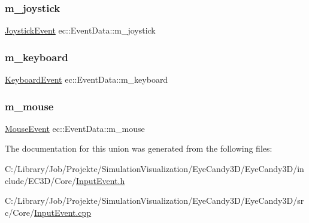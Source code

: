 \subsubsection{\texorpdfstring{m\+\_\+joystick}{m\_joystick}}
{\footnotesize\ttfamily \mbox{\hyperlink{structec_1_1_joystick_event}{Joystick\+Event}} ec\+::\+Event\+Data\+::m\+\_\+joystick}

\mbox{\label{unionec_1_1_event_data_a76d355d62f63e9947187e08bc520af45}} 
\subsubsection{\texorpdfstring{m\+\_\+keyboard}{m\_keyboard}}
{\footnotesize\ttfamily \mbox{\hyperlink{structec_1_1_keyboard_event}{Keyboard\+Event}} ec\+::\+Event\+Data\+::m\+\_\+keyboard}

\mbox{\label{unionec_1_1_event_data_a77d2274d869ab46f8f5f1e5d9616d4d3}} 
\subsubsection{\texorpdfstring{m\+\_\+mouse}{m\_mouse}}
{\footnotesize\ttfamily \mbox{\hyperlink{structec_1_1_mouse_event}{Mouse\+Event}} ec\+::\+Event\+Data\+::m\+\_\+mouse}



The documentation for this union was generated from the following files\+:\begin{DoxyCompactItemize}
\item 
C\+:/\+Library/\+Job/\+Projekte/\+Simulation\+Visualization/\+Eye\+Candy3\+D/\+Eye\+Candy3\+D/include/\+E\+C3\+D/\+Core/\mbox{\hyperlink{_input_event_8h}{Input\+Event.\+h}}\item 
C\+:/\+Library/\+Job/\+Projekte/\+Simulation\+Visualization/\+Eye\+Candy3\+D/\+Eye\+Candy3\+D/src/\+Core/\mbox{\hyperlink{_input_event_8cpp}{Input\+Event.\+cpp}}\end{DoxyCompactItemize}
